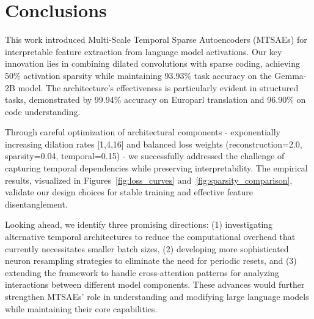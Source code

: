 \documentclass{article} %
\begin{document}
\section{Conclusions}
\label{sec:conclusion}

This work introduced Multi-Scale Temporal Sparse Autoencoders (MTSAEs) for interpretable feature extraction from language model activations. Our key innovation lies in combining dilated convolutions with sparse coding, achieving 50\% activation sparsity while maintaining 93.93\% task accuracy on the Gemma-2B model. The architecture's effectiveness is particularly evident in structured tasks, demonstrated by 99.94\% accuracy on Europarl translation and 96.90\% on code understanding.

Through careful optimization of architectural components - exponentially increasing dilation rates [1,4,16] and balanced loss weights (reconstruction=2.0, sparsity=0.04, temporal=0.15) - we successfully addressed the challenge of capturing temporal dependencies while preserving interpretability. The empirical results, visualized in Figures~\ref{fig:loss_curves} and~\ref{fig:sparsity_comparison}, validate our design choices for stable training and effective feature disentanglement.

Looking ahead, we identify three promising directions: (1) investigating alternative temporal architectures to reduce the computational overhead that currently necessitates smaller batch sizes, (2) developing more sophisticated neuron resampling strategies to eliminate the need for periodic resets, and (3) extending the framework to handle cross-attention patterns for analyzing interactions between different model components. These advances would further strengthen MTSAEs' role in understanding and modifying large language models while maintaining their core capabilities.



\end{document}
